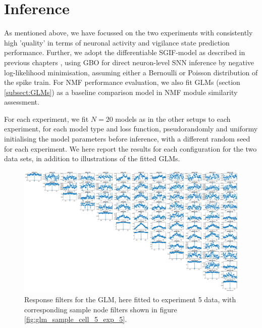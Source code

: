 \documentclass[mphil,deptreport,ianc]{infthesis} %
\begin{document}

\section{Inference}

As mentioned above, we have focussed on the two experiments with consistently high 'quality' in terms of neuronal activity and vigilance state prediction performance.
Further, we adopt the differentiable SGIF-model as described in previous chapters \cite{Rene2020}, using GBO for direct neuron-level SNN inference by negative log-likelihood minimisation, assuming either a Bernoulli or Poisson distribution of the spike train.
For NMF performance evaluation, we also fit GLMs (section \ref{subsect:GLMs}) as a baseline comparison model in NMF module similarity assessment.

For each experiment, we fit $N=20$ models as in the other setups to each experiment, for each model type and loss function, pseudorandomly and uniformy initialising the model parameters before inference, with a different random seed for each experiment.
We here report the results for each configuration for the two data sets, in addition to illustrations of the fitted GLMs.

\begin{figure}
    \includegraphics[width=1.1\columnwidth]{figures/sleep/plot1_cell5_pdf.eps}
    \caption{Response filters for the GLM, here fitted to experiment 5 data, with corresponding sample node filters shown in figure \ref{fig:glm_sample_cell_5_exp_5}.}
\end{figure}
\end{document}
